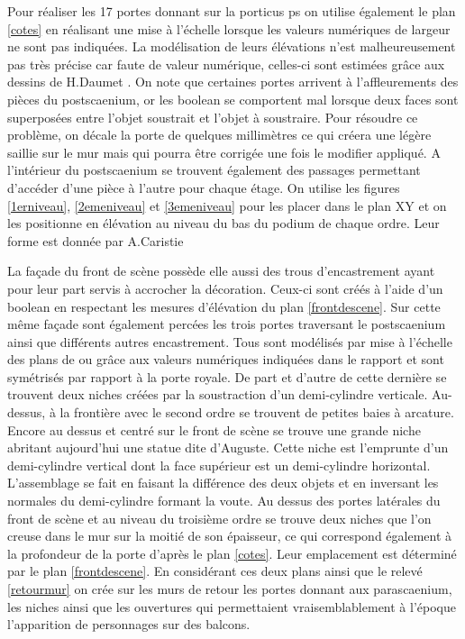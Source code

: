 Pour réaliser les 17 portes donnant sur la \gls{porticus ps} on utilise également le plan \ref{cotes} en réalisant une mise à l'échelle lorsque les valeurs numériques de largeur ne sont pas indiquées. La modélisation de leurs élévations n'est malheureusement pas très précise car faute de valeur numérique, celles-ci sont estimées grâce aux dessins de H.Daumet \cite[Pl. XII, XIII, XIV]{orangePl}. On note que certaines portes arrivent à l'affleurements des pièces du \gls{postscaenium}, or les \gls{boolean} se comportent mal lorsque deux faces sont superposées entre l'objet soustrait et l'objet à soustraire. Pour résoudre ce problème, on décale la porte de quelques millimètres ce qui créera une légère saillie sur le mur mais qui pourra être corrigée une fois le modifier appliqué. A l'intérieur du \gls{postscaenium} se trouvent également des passages permettant d'accéder d'une pièce à l'autre pour chaque étage. On utilise les figures \ref{1erniveau}, \ref{2emeniveau} et \ref{3emeniveau} pour les placer dans le plan XY et on les positionne en élévation au niveau du bas du podium de chaque ordre. Leur forme est donnée par A.Caristie \cite[Pl. II]{orangePl}

La façade du front de scène possède elle aussi des trous d'encastrement ayant pour leur part servis à accrocher la décoration. Ceux-ci sont créés à l'aide d'un \gls{boolean} en respectant les mesures d'élévation du plan \ref{frontdescene}. Sur cette même façade sont également percées les trois portes traversant le \gls{postscaenium} ainsi que différents autres encastrement. Tous sont modélisés par mise à l'échelle des plans de \cite{orangePl} ou grâce aux valeurs numériques indiquées dans le rapport \cite{orangeTxt} et sont symétrisés par rapport à la porte royale. De part et d'autre de cette dernière se trouvent deux niches créées par la soustraction d'un demi-cylindre verticale. Au-dessus, à la frontière avec le second ordre se trouvent de petites baies à arcature. Encore au dessus et centré sur le front de scène se trouve une grande niche abritant aujourd'hui une statue dite d'Auguste. Cette niche est l'emprunte d'un demi-cylindre vertical dont la face supérieur est un demi-cylindre horizontal. L'assemblage se fait en faisant la différence des deux objets et en inversant les normales du demi-cylindre formant la voute. Au dessus des portes latérales du front de scène et au niveau du troisième ordre se trouve deux niches que l'on creuse dans le mur sur la moitié de son épaisseur, ce qui correspond également à la profondeur de la porte d'après le plan \ref{cotes}. Leur emplacement est déterminé par le plan \ref{frontdescene}. En considérant ces deux plans ainsi que le relevé \ref{retourmur} on crée sur les murs de retour les portes donnant aux \gls{parascaenium}, les niches ainsi que les ouvertures qui permettaient vraisemblablement à l'époque l'apparition de personnages sur des balcons. 


